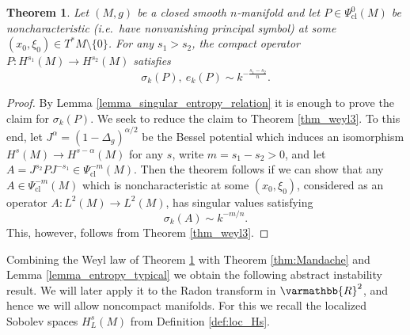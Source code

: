 \documentclass[12pt,twoside]{amsart}
\numberwithin{equation}{section}
\renewcommand{\mathbb}{\varmathbb}
\newtheorem{theorem}{Theorem}[section]
\newcommand{\mR}{\mathbb{R}}                    %
\begin{document}
\begin{theorem}
\label{thm:Weyl_microlocal}
Let $(M,g)$ be a closed smooth $n$-manifold and let $P \in \Psi^0_{\mathrm{cl}}(M)$ be noncharacteristic (i.e.\ have nonvanishing principal symbol) at some $(x_0, \xi_0) \in T^* M \setminus \{0\}$.  For any $s_1 > s_2$, the compact operator $P: H^{s_1}(M) \to H^{s_2}(M)$ satisfies 
\[
\sigma_k(P), \ e_k(P) \sim k^{-\frac{s_1-s_2}{n}}.
\]
\end{theorem}

\begin{proof}
By Lemma \ref{lemma_singular_entropy_relation} it is enough to prove the claim for $\sigma_k(P)$. We seek to reduce the claim to Theorem \ref{thm_weyl3}. To this end, let $J^{\alpha} = (1-\Delta_g)^{\alpha/2}$ be the Bessel potential which induces an isomorphism $H^s(M) \to H^{s-\alpha}(M)$ for any $s$, write $m = s_1-s_2 > 0$, and let $A = J^{s_2} P J^{-s_1} \in \Psi^{-m}_{\mathrm{cl}}(M)$. Then the theorem follows if we can show that any $A \in \Psi^{-m}_{\mathrm{cl}}(M)$ which is noncharacteristic at some $(x_0, \xi_0)$, considered as an operator $A: L^2(M) \to L^2(M)$, has singular values satisfying 
\[
\sigma_k(A) \sim k^{-m/n}.
\]
This, however, follows from Theorem \ref{thm_weyl3}.
\end{proof}



Combining the Weyl law of Theorem \ref{thm:Weyl_microlocal} with Theorem \ref{thm:Mandache} and Lemma \ref{lemma_entropy_typical} we obtain the following abstract instability result. We will later apply it to the Radon transform in $\mR^2$, and hence we will allow noncompact manifolds. For this we recall the localized Sobolev spaces $H^{s}_L(M)$ from Definition \ref{def:loc_Hs}.
\end{document}
